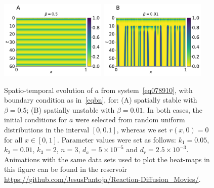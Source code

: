 \documentclass[%
 preprint,
 aip, 
 amsmath,amssymb,
]{revtex4-2}
\begin{document}
	\begin{figure}[t!]
		\centering
		\includegraphics[width=2in]{Figures/Fig03aRev.pdf}
		\includegraphics[width=2in]{Figures/Fig03bRev.pdf}
		\caption{Spatio-temporal evolution of $a$ from system~\eqref{eq078910}, with
			boundary condition as in~\eqref{eqbn}, for: (A) spatially stable with
			$\beta=0.5$; (B) spatially unstable with $\beta=0.01$. In both cases, the
			initial conditions for $a$ were selected from random uniform distributions in
			the interval $[0, 0.1]$, whereas we set $r(x, 0) = 0$ for all $x\in[0,1]$.
			Parameter values were set as follows: $k_1=0.05$, $k_2=0.01$, $k_3=2$, $n=3$, $d_a =
			5\times10^{-5}$ and $d_r=2.5\times10^{-3}$. Animations with the same 
			data sets used to plot the heat-maps in this figure can be found in the 
			reservoir \url{https://github.com/JesusPantoja/Reaction-Diffusion_Movies/}.}
		\label{Fig03}
	\end{figure}
	
\end{document}
